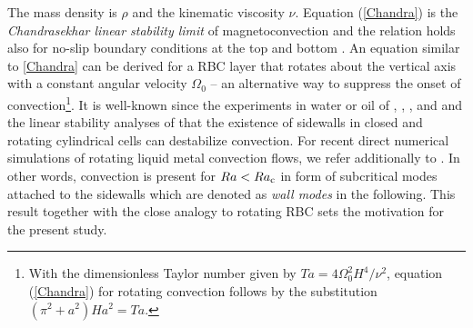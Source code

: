 \documentclass{jfm}
\begin{document}
The mass density is $\rho$ and the kinematic viscosity $\nu$. Equation (\ref{Chandra}) 
is the {\em Chandrasekhar linear stability limit} of magnetoconvection and the relation holds also for no-slip boundary conditions at 
the top and bottom \citep{Chandrasekhar1961}. An equation similar to \eqref{Chandra} can be derived for a RBC layer that rotates about the vertical 
axis with a constant angular velocity $\Omega_0$ -- an alternative way to suppress the onset of convection\footnote{With the dimensionless 
Taylor number given by $Ta=4\Omega_0^2 H^4/\nu^2$, equation (\ref{Chandra}) for rotating convection follows by the substitution 
$(\pi^2+a^2)Ha^2=Ta$.}. It is well-known since the experiments in water or oil of \cite{Zhong1991}, \cite{Ecke1992}, \cite{Liu1999}, and \cite{King2012}
and the linear stability analyses of \cite{Goldstein1993,Goldstein1994} that the existence of sidewalls in closed and rotating cylindrical cells can 
destabilize convection. For recent direct numerical simulations of rotating liquid metal convection flows, we refer additionally to \cite{Horn2017}. 
In other words, convection is present for $Ra<Ra_{\rm c}$ in form of subcritical modes attached to the sidewalls which are denoted as {\em wall modes} in the following.  
This result together with the close analogy to rotating RBC sets the motivation for the present study.
    
\end{document}
